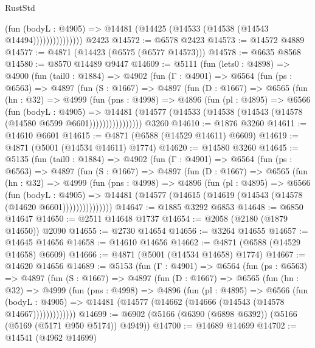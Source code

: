 \begin{lexlean}{RustStd}
\begin{coremodule}
{\begin{coremodule}
{{{{{{{{{{{{{{{{{{{{{{{{{{{{{                        (fun (bodyL : @4905) =>
                        @14481 (@14425 (@14533 (@14538 (@14543 @14494)))))))))))))))
    @2423
@14572 := @6578 @2423
@14573 := @14572 @4889
@14577 := @4871 (@14423 (@6575 (@6577 @14573)))
@14578 := @6635 @8568
@14580 := @8570 @14489 @9447
@14609 := @5111
    (fun (lets0 : @4898) =>
    @4900
      (fun (tail0 : @1884) =>
      @4902
        (fun (Γ : @4901) =>
        @6564
          (fun (ps : @6563) =>
          @4897
            (fun (S : @1667) =>
            @4897
              (fun (D : @1667) =>
              @6565
                (fun (hn : @32) =>
                @4999
                  (fun (pns : @4998) =>
                  @4896
                    (fun (pl : @4895) =>
                    @6566
                      (fun (bodyL : @4905) =>
                      @14481
                        (@14577 (@14533 (@14538 (@14543 (@14578 (@14580 @6599 @6601))))))))))))))))
    @3260
@14610 := @1876 @3260
@14611 := @14610 @6601
@14615 := @4871 (@6588 (@14529 @14611) @6609)
@14619 := @4871 (@5001 (@14534 @14611) @1774)
@14620 := @14580 @3260
@14645 := @5135
    (fun (tail0 : @1884) =>
    @4902
      (fun (Γ : @4901) =>
      @6564
        (fun (ps : @6563) =>
        @4897
          (fun (S : @1667) =>
          @4897
            (fun (D : @1667) =>
            @6565
              (fun (hn : @32) =>
              @4999
                (fun (pns : @4998) =>
                @4896
                  (fun (pl : @4895) =>
                  @6566
                    (fun (bodyL : @4905) =>
                    @14481 (@14577 (@14615 (@14619 (@14543 (@14578 (@14620 @6601)))))))))))))))
@14647 := @1885 @3292 @6853
@14648 := @6850 @14647
@14650 := @2511 @14648 @1737
@14654 := @2058 (@2180 (@1879 @14650)) @2090
@14655 := @2730 @14654
@14656 := @3264 @14655
@14657 := @14645 @14656
@14658 := @14610 @14656
@14662 := @4871 (@6588 (@14529 @14658) @6609)
@14666 := @4871 (@5001 (@14534 @14658) @1774)
@14667 := @14620 @14656
@14689 := @5153
    (fun (Γ : @4901) =>
    @6564
      (fun (ps : @6563) =>
      @4897
        (fun (S : @1667) =>
        @4897
          (fun (D : @1667) =>
          @6565
            (fun (hn : @32) =>
            @4999
              (fun (pns : @4998) =>
              @4896
                (fun (pl : @4895) =>
                @6566
                  (fun (bodyL : @4905) =>
                  @14481 (@14577 (@14662 (@14666 (@14543 (@14578 @14667)))))))))))))
@14699 := @6902 (@5166 (@6390 (@6898 @6392)) (@5166 (@5169 (@5171 @950 @5174)) @4949))
@14700 := @14689 @14699
@14702 := @14541 (@4962 @14699)
}}}}}}}}}}}}}}}}}}}}}}}}}}}}}
\end{coremodule}}
\end{coremodule}
\end{lexlean}

